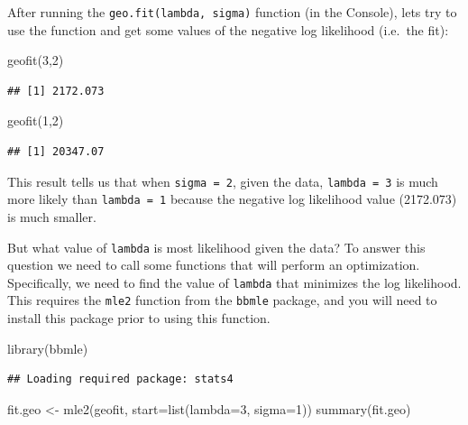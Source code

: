 \documentclass[
]{book}
\newenvironment{Shaded}{\begin{snugshade}}{\end{snugshade}}
\newcommand{\AttributeTok}[1]{\textcolor[rgb]{0.77,0.63,0.00}{#1}}
\newcommand{\DecValTok}[1]{\textcolor[rgb]{0.00,0.00,0.81}{#1}}
\newcommand{\FunctionTok}[1]{\textcolor[rgb]{0.00,0.00,0.00}{#1}}
\newcommand{\NormalTok}[1]{#1}
\newcommand{\OtherTok}[1]{\textcolor[rgb]{0.56,0.35,0.01}{#1}}
\begin{document}
After running the \texttt{geo.fit(lambda,\ sigma)} function (in the Console), lets try to use the function and get some values of the negative log likelihood (i.e.~the fit):

\begin{Shaded}
\begin{Highlighting}[]
\FunctionTok{geofit}\NormalTok{(}\DecValTok{3}\NormalTok{,}\DecValTok{2}\NormalTok{)}
\end{Highlighting}
\end{Shaded}

\begin{verbatim}
## [1] 2172.073
\end{verbatim}

\begin{Shaded}
\begin{Highlighting}[]
\FunctionTok{geofit}\NormalTok{(}\DecValTok{1}\NormalTok{,}\DecValTok{2}\NormalTok{)}
\end{Highlighting}
\end{Shaded}

\begin{verbatim}
## [1] 20347.07
\end{verbatim}

This result tells us that when \texttt{sigma\ =\ 2}, given the data, \texttt{lambda\ =\ 3} is much more likely than \texttt{lambda\ =\ 1} because the negative log likelihood value (2172.073) is much smaller.

But what value of \texttt{lambda} is most likelihood given the data? To answer this question we need to call some functions that will perform an optimization. Specifically, we need to find the value of \texttt{lambda} that minimizes the log likelihood. This requires the \texttt{mle2} function from the \texttt{bbmle} package, and you will need to install this package prior to using this function.

\begin{Shaded}
\begin{Highlighting}[]
\FunctionTok{library}\NormalTok{(bbmle)}
\end{Highlighting}
\end{Shaded}

\begin{verbatim}
## Loading required package: stats4
\end{verbatim}

\begin{Shaded}
\begin{Highlighting}[]
\NormalTok{fit.geo }\OtherTok{\textless{}{-}} \FunctionTok{mle2}\NormalTok{(geofit, }\AttributeTok{start=}\FunctionTok{list}\NormalTok{(}\AttributeTok{lambda=}\DecValTok{3}\NormalTok{, }\AttributeTok{sigma=}\DecValTok{1}\NormalTok{))}
\FunctionTok{summary}\NormalTok{(fit.geo)}
\end{Highlighting}
\end{Shaded}
\end{document}
